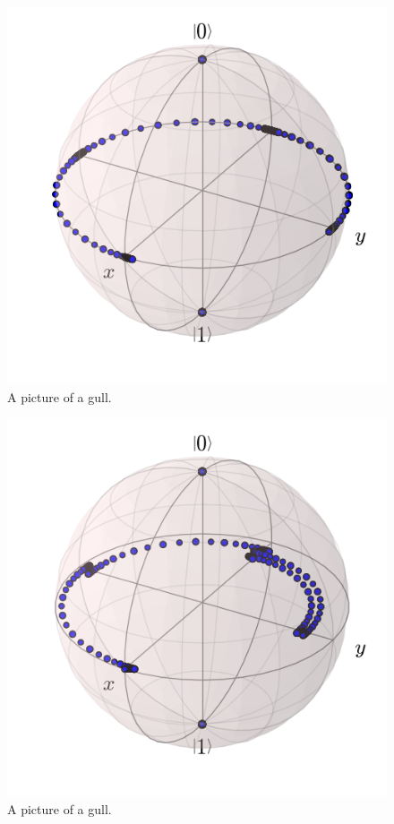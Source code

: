 \begin{figure}[!ht]
  \caption{A picture of a gull.}
  \centering
    \includegraphics[width=\textwidth]{Figures/Circ_orbit_odd_no_dephasing.png}
\end{figure}




\begin{figure}[!ht]
  \caption{A picture of a gull.}
  \centering
    \includegraphics[width=\textwidth]{Figures/Circ_orbit_odd_100_dephasing.png}
\end{figure}

